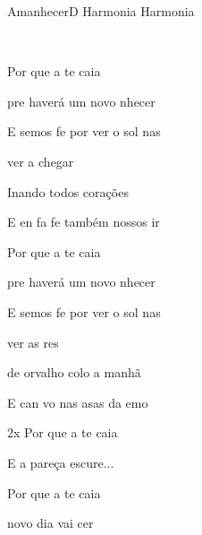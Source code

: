 \documentclass[a4,12pt,oneside]{book}
\newcommand{\RevDate}{\today}
\newcommand{\NotCCLIed}{\relax}
\begin{document}
\begin{song}{Amanhecer}{D}
  {Harmonia}
  {Harmonia}
  {}
  {\NotCCLIed}

	\renewcommand{\RevDate}{12 de maio de 2014}
  
	
	\ifChordBk
		{\vspace{-3em}\flushright{\Dchord \quad \Gchord \quad \Aschord}\\}
		\vspace{-1em}
	\fi

	
	\begin{SBVerse}
		Por  que a te caia
		
		pre haverá um novo nhecer
		
		E  semos fe por ver o sol nas
		
		 ver a  chegar
		
		Inando todos  corações
		
		E en fa fe também nossos ir
	\end{SBVerse}
	
	\begin{SBVerse}
		Por  que a te caia
		
		pre haverá um novo nhecer
		
		E  semos fe por ver o sol nas\Ch{D}{cer}
		
		 ver as \Ch{G}{flo}res
		
		 de orvalho colo a manhã
		
		E  can vo nas asas da emo\Ch{D}{ção}
	\end{SBVerse}
	
	\begin{SBBracket}{2x}
		Por  que a te caia
		
		E a  pareça escure...
		
		Por  que a te caia
		
		 novo dia vai cer
	\end{SBBracket}
\end{song}
\end{document}
